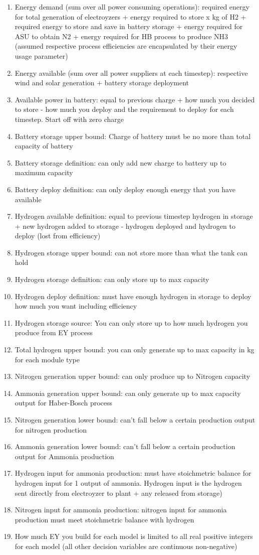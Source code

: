 \documentclass[12 pt]{article}
\begin{document}
\begin{enumerate}
\item Energy demand (sum over all power consuming operations): required energy for total generation of electroyzers + energy required to store x kg of H2 + required energy to store and save in battery storage + energy required for ASU to obtain N2 + energy required for HB process to produce NH3 (assumed respective process efficiencies are encapsulated by their energy usage parameter)
\item Energy available (sum over all power suppliers at each timestep): respective wind and solar generation + battery storage deployment
\item Available power in battery: equal to previous charge + how much you decided to store - how much you deploy and the requirement to deploy for each timestep. Start off with zero charge
\item Battery storage upper bound: Charge of battery must be no more than total capacity of battery
\item Battery storage definition: can only add new charge to battery up to maximum capacity
\item Battery deploy definition: can only deploy enough energy that you have available
\item Hydrogen available definition: equal to previous timestep hydrogen in storage + new hydrogen added to storage - hydrogen deployed and hydrogen to deploy (lost from efficiency)
\item Hydrogen storage upper bound: can not store more than what the tank can hold
\item Hydrogen storage definition: can only store up to max capacity
\item Hydrogen deploy definition: must have enough hydrogen in storage to deploy how much you want including efficiency
\item Hydrogen storage source: You can only store up to how much hydrogen you produce from EY process
\item Total hydrogen upper bound: you can only generate up to max capacity in kg for each module type
\item Nitrogen generation upper bound: can only produce up to Nitrogen capacity
\item Ammonia generation upper bound: can only generate up to max capacity output for Haber-Bosch process
\item Nitrogen generation lower bound: can't fall below a certain production output for nitrogen production
\item Ammonia generation lower bound: can't fall below a certain production output for Ammonia production
\item Hydrogen input for ammonia production: must have stoichmetric balance for hydrogen input for 1 output of ammonia. Hydrogen input is the hydrogen sent directly from electroyzer to plant + any released from storage)
\item Nitrogen input for ammonia production: nitrogen input for ammonia production must meet stoichmetric balance with hydrogen
\item How much EY you build for each model is limited to all real positive integers for each model (all other decision variables are continuous non-negative)
\end{enumerate}
\end{document}
